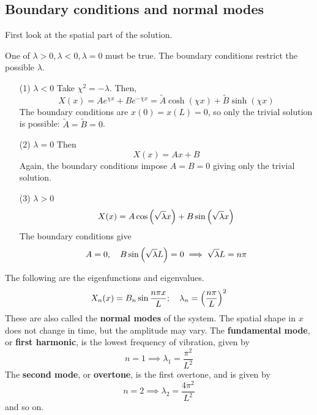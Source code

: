 \documentclass[a4paper]{article}
\begin{document}
\subsection{Boundary conditions and normal modes}

First look at the spatial part of the solution.

One of \( \lambda > 0, \lambda < 0, \lambda = 0 \) must be true.
The boundary conditions restrict the possible \( \lambda \).
\begin{enumerate}[align=left]
	\item[(1) \( \lambda < 0 \)] Take \( \chi^2 = -\lambda \).
	      Then,
	      \[
		      X(x) = Ae^{\chi x} + Be^{-\chi x} = \tilde{A} \cosh (\chi x) + \tilde{B} \sinh (\chi x)
	      \]
	      The boundary conditions are \( x(0) = x(L) = 0 \), so only the trivial solution is possible: \( \tilde{A} = \tilde{B} = 0 \).
	\item[(2) \( \lambda = 0 \)] Then
	      \[
		      X(x) = Ax + B
	      \]
	      Again, the boundary conditions impose \( A = B = 0 \) giving only the trivial solution.
	\item[(3) \( \lambda > 0 \)]
	      \[
		      X(x) = A \cos \qty(\sqrt{\lambda} x) + B \sin \qty(\sqrt{\lambda} x)
	      \]
	      The boundary conditions give
	      \[
		      A = 0,\quad B \sin \qty(\sqrt{\lambda} L) = 0 \implies \sqrt{\lambda} L = n \pi
	      \]
\end{enumerate}
The following are the eigenfunctions and eigenvalues.
\[
	X_n(x) = B_n \sin \frac{n \pi x}{L};\quad \lambda_n = \qty(\frac{n \pi}{L})^2
\]
These are also called the \textbf{normal modes} of the system.
The spatial shape in \( x \) does not change in time, but the amplitude may vary.
The \textbf{fundamental mode}, or \textbf{first harmonic}, is the lowest frequency of vibration, given by
\[
	n = 1 \implies \lambda_1 = \frac{\pi^2}{L^2}
\]
The \textbf{second mode}, or \textbf{overtone}, is the first overtone, and is given by
\[
	n = 2 \implies \lambda_2 = \frac{4\pi^2}{L^2}
\]
and so on. 
\end{document}
